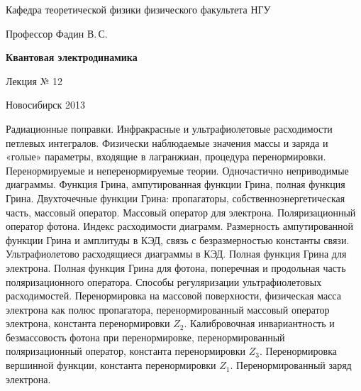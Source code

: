 \documentclass[12pt,pagesize,paper=landscape,paper=192mm:108mm]{scrbook}
\begin{document}
\begin{titlepage}
\begin{center}
    Кафедра теоретической физики физического факультета НГУ
    \medskip

    \Large
    Профессор Фадин В.\,С.
    \bigskip

    \huge
    \textbf{Квантовая электродинамика}
    \bigskip

    \Large
    Лекция № 12
    \vfill

    \normalsize
    \vfill

    \normalsize \ccbysa\hspace{0.5em}  Новосибирск 2013
  \end{center}
\end{titlepage}
\vspace*{-1em}
\begin{center}
\vfill
  \begin{minipage}{0.85\linewidth}
    Радиационные поправки. Инфракрасные и ультрафиолетовые
    расходимости петлевых интегралов. Физически наблюдаемые значения
    массы и заряда и «голые» параметры, входящие в лагранжиан,
    процедура перенормировки. Перенормируемые и неперенормируемые
    теории. Одночастично неприводимые диаграммы. Функция Грина,
    ампутированная функции Грина, полная функция Грина. Двухточечные
    функции Грина: пропагаторы, собственноэнергетическая часть,
    массовый оператор. Массовый оператор для электрона.
    Поляризационный оператор фотона. Индекс расходимости
    диаграмм. Размерность ампутированной функции Грина и амплитуды в
    КЭД, связь с безразмерностью константы связи. Ультрафиолетово
    расходящиеся диаграммы в КЭД. Полная функция Грина для
    электрона. Полная функция Грина для фотона, поперечная и
    продольная часть поляризационного оператора. Способы регуляризации
    ультрафиолетовых расходимостей.  Перенормировка на массовой
    поверхности, физическая масса электрона как полюс пропагатора,
    перенормированный массовый оператор электрона, константа
    перенормировки $Z_2$. Калибровочная инвариантность и безмассовость
    фотона при перенормировке, перенормированный поляризационный
    оператор, константа перенормировки $Z_3$.  Перенормировка
    вершинной функции, константа перенормировки
    $Z_1$. Перенормированный заряд электрона.
  \end{minipage}
  \vfill

\end{center}
\end{document}
